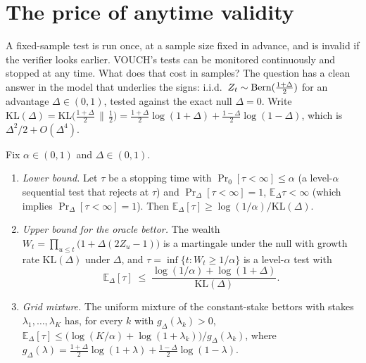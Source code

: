 \section{The price of anytime validity}\label{sec:anytime}

A fixed-sample test is run once, at a sample size fixed in advance, and is invalid if the
verifier looks earlier. VOUCH's tests can be monitored continuously and stopped at any
time. What does that cost in samples? The question has a clean answer in the model that
underlies the signs: i.i.d.\ $Z_t\sim\mathrm{Bern}(\frac{1+\Delta}{2})$ for an advantage
$\Delta\in(0,1)$, tested against the exact null $\Delta=0$. Write
$\mathrm{KL}(\Delta)=\mathrm{KL}\bigl(\frac{1+\Delta}2\,\|\,\frac12\bigr)=\frac{1+\Delta}2
\log(1+\Delta)+\frac{1-\Delta}2\log(1-\Delta)$, which is $\Delta^2/2+O(\Delta^4)$.

\begin{proposition}\label{prop:anytime}
Fix $\alpha\in(0,1)$ and $\Delta\in(0,1)$.
\begin{enumerate}
\item[(i)] \emph{Lower bound.} Let $\tau$ be a stopping time with $\Pr_0[\tau<\infty]\le
\alpha$ (a level-$\alpha$ sequential test that rejects at $\tau$) and $\Pr_\Delta[\tau<
\infty]=1$, $\mathbb{E}_\Delta\tau<\infty$ (which implies $\Pr_\Delta[\tau<\infty]=1$). Then
$\mathbb{E}_\Delta[\tau]\ge\log(1/\alpha)/\mathrm{KL}(\Delta)$.
\item[(ii)] \emph{Upper bound for the oracle bettor.} The wealth
$W_t=\prod_{u\le t}\bigl(1+\Delta(2Z_u-1)\bigr)$ is a martingale under the null with growth
rate $\mathrm{KL}(\Delta)$ under $\Delta$, and $\tau=\inf\{t:W_t\ge1/\alpha\}$ is a
level-$\alpha$ test with
\[
\mathbb{E}_\Delta[\tau]\;\le\;\frac{\log(1/\alpha)+\log(1+\Delta)}{\mathrm{KL}(\Delta)} .
\]
\item[(iii)] \emph{Grid mixture.} The uniform mixture of the constant-stake bettors with
stakes $\lambda_1,\dots,\lambda_K$ has, for every $k$ with $g_\Delta(\lambda_k)>0$,
$\mathbb{E}_\Delta[\tau]\le\bigl(\log(K/\alpha)+\log(1+\lambda_k)\bigr)/g_\Delta(\lambda_k)$,
where $g_\Delta(\lambda)=\frac{1+\Delta}2\log(1+\lambda)+\frac{1-\Delta}2\log(1-\lambda)$.
\end{enumerate}
\end{proposition}

